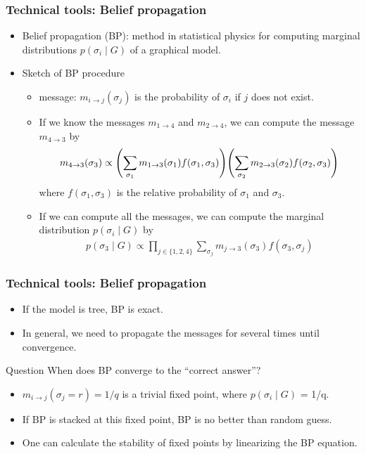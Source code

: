 \documentclass[dvipdfmx,11pt]{beamer}
\begin{document}
\begin{frame}
  \frametitle{Technical tools: Belief propagation}
  \begin{itemize}
    \item \alert{Belief propagation} (BP): method in statistical physics for computing marginal distributions $p(\sigma_i \mid G)$ of a graphical model.
    \item Sketch of BP procedure
    \begin{itemize}
      \item \alert{message}: $m_{i \to j}(\sigma_j)$ is the probability of $\sigma_i$ if $j$ does not exist. 
      \item If we know the messages $m_{1 \to 4}$ and $m_{2 \to 4}$, we can compute the message $m_{4 \to 3}$ by
      \begin{align*}
        m_{4 \to 3}(\sigma_3) \propto \qty(\sum_{\sigma_1} m_{1 \to 3}(\sigma_1)f(\sigma_1, \sigma_3)) \qty(\sum_{\sigma_2} m_{2 \to 3}(\sigma_2)f(\sigma_2, \sigma_3))
      \end{align*}
      where $f(\sigma_1, \sigma_3)$ is the relative probability of $\sigma_1$ and $\sigma_3$.
    \item If we can compute all the messages, we can compute the marginal distribution $p(\sigma_i \mid G)$ by
    \begin{align*}
      p(\sigma_3 \mid G) \propto \prod_{j \in \{1,2,4\} } \sum_{\sigma_j} m_{j \to 3}(\sigma_3) f(\sigma_3, \sigma_j)
    \end{align*}

    \end{itemize}

  \end{itemize}

\end{frame}

\begin{frame}
  \frametitle{Technical tools: Belief propagation}
\begin{itemize}
  \item If the model is tree, BP is exact.
  \item In general, we need to propagate the messages for several times until convergence.
\end{itemize}


\begin{block}{Question}
  When does BP converge to the ``correct answer''?
\end{block}
\begin{itemize}
  \item $m_{i \to j}(\sigma_j=r) = 1/q$ is a trivial fixed point, where $p(\sigma_i \mid G)$ = 1/q.
  \item If BP is stacked at this fixed point, BP is no better than random guess.
  \item One can calculate the stability of fixed points by linearizing the BP equation. 
\end{itemize}

\end{frame}
\end{document}
